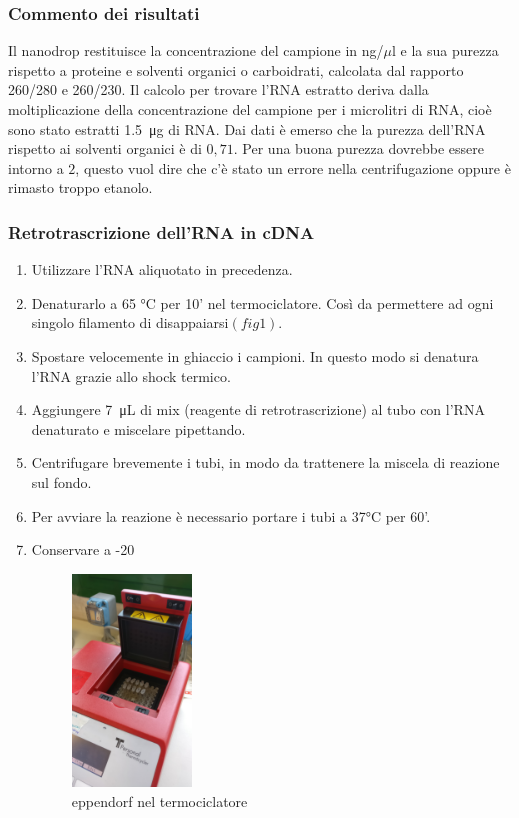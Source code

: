 \subsubsection{Commento dei risultati}
Il nanodrop restituisce la concentrazione del campione in ng/$\mu$l e la sua purezza rispetto
a proteine e solventi organici o carboidrati, calcolata dal rapporto 260/280 e 260/230.
Il calcolo per trovare l'RNA estratto deriva dalla moltiplicazione della concentrazione del
campione per i microlitri di RNA, cioè sono stato estratti \SI{1,5}{\micro\gram} di RNA.
Dai dati è emerso che la purezza dell'RNA rispetto ai solventi organici è di $0,71$.
Per una buona purezza dovrebbe essere intorno a $2$, questo vuol dire
che c'è stato un errore nella centrifugazione oppure è rimasto troppo etanolo.

\subsubsection{Retrotrascrizione dell'RNA in cDNA}
\begin{enumerate}

\item Utilizzare l'RNA aliquotato in precedenza.
\item Denaturarlo a 65 °C per 10' nel termociclatore.
Così da permettere ad ogni singolo filamento di disappaiarsi$(fig1)$.
\item Spostare velocemente in ghiaccio i campioni.
In questo modo si denatura l'RNA grazie allo shock termico.
\item Aggiungere \SI{7}{\micro\liter} di mix (reagente di retrotrascrizione) al tubo con l'RNA
denaturato e miscelare pipettando.
\item Centrifugare brevemente i tubi,
in modo da trattenere la miscela di reazione sul fondo.
\item Per avviare la reazione \`e necessario portare i tubi a 37°C per 60'.
\item Conservare a -20\textcelsius

\begin{figure}[H]

\centering
\includegraphics[width=0.3\textwidth]{./immagini/termociclatore.jpg}
\caption{eppendorf nel termociclatore}
\label{termociclatore}

\end{figure}

\end{enumerate}
